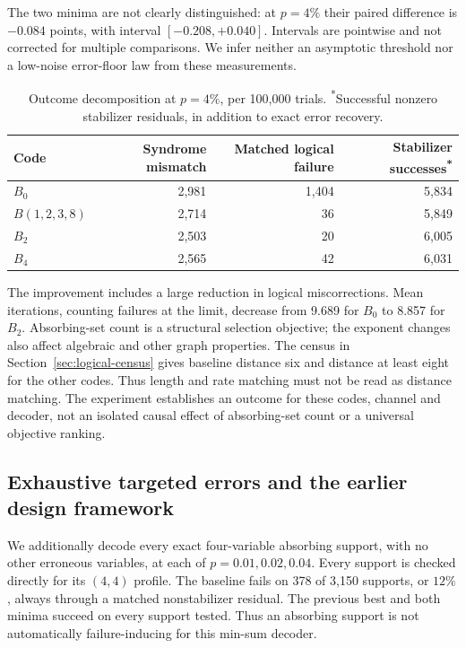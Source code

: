 \documentclass[11pt]{article}
\theoremstyle{definition}
\theoremstyle{remark}
\begin{document}
The two minima are not clearly distinguished: at $p=4\%$ their paired
difference is $-0.084$ points, with interval $[-0.208,+0.040]$.
Intervals are pointwise and not corrected for multiple comparisons.
We infer neither an asymptotic threshold nor a low-noise error-floor
law from these measurements.

\begin{table}[ht]
\centering\small
\begin{tabular}{lrrr}
\toprule
Code & Syndrome mismatch & Matched logical failure & Stabilizer successes\textsuperscript{*} \\
\midrule
$B_0$ & 2,981 & 1,404 & 5,834 \\
$B(1,2,3,8)$ & 2,714 & 36 & 5,849 \\
$B_2$ & 2,503 & 20 & 6,005 \\
$B_4$ & 2,565 & 42 & 6,031 \\
\bottomrule
\end{tabular}
\caption{Outcome decomposition at $p=4\%$, per 100,000 trials.
\textsuperscript{*}Successful nonzero stabilizer residuals, in addition
to exact error recovery.}
\label{tab:outcomes}
\end{table}

The improvement includes a large reduction in logical miscorrections.
Mean iterations, counting failures at the limit, decrease from 9.689
for $B_0$ to 8.857 for $B_2$. Absorbing-set count is a structural
selection objective; the exponent changes also affect algebraic and
other graph properties. The census in Section~\ref{sec:logical-census} gives baseline distance six
and distance at least eight for the other codes. Thus length and rate
matching must not be read as distance matching. The experiment establishes an outcome for these codes,
channel and decoder, not an isolated causal effect of absorbing-set count
or a universal objective ranking.

\subsection{Exhaustive targeted errors and the earlier design framework}
We additionally decode every exact four-variable absorbing support,
with no other erroneous variables, at each of $p=0.01,0.02,0.04$.
Every support is checked directly for its $(4,4)$ profile. The baseline
fails on 378 of 3,150 supports, or $12\%$, always through a matched
nonstabilizer residual. The previous best and both minima succeed on
every support tested. Thus an absorbing support is not automatically
failure-inducing for this min-sum decoder.
\end{document}
